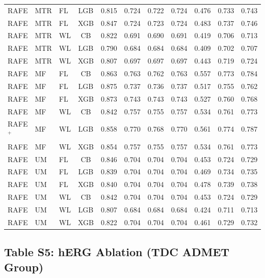 \documentclass[9pt,a4paper]{article}
\begin{document}
\begin{scriptsize}
\begin{longtable}{lllcrrrrrrr}
RAFE & MTR & FL & LGB & 0.815 & 0.724 & 0.722 & 0.724 & 0.476 & 0.733 & 0.743 \\
RAFE & MTR & FL & XGB & 0.847 & 0.724 & 0.723 & 0.724 & 0.483 & 0.737 & 0.746 \\
RAFE & MTR & WL & CB  & 0.822 & 0.691 & 0.690 & 0.691 & 0.419 & 0.706 & 0.713 \\
RAFE & MTR & WL & LGB & 0.790 & 0.684 & 0.684 & 0.684 & 0.409 & 0.702 & 0.707 \\
RAFE & MTR & WL & XGB & 0.807 & 0.697 & 0.697 & 0.697 & 0.443 & 0.719 & 0.724 \\
RAFE & MF  & FL & CB  & 0.863 & 0.763 & 0.762 & 0.763 & 0.557 & 0.773 & 0.784 \\
RAFE & MF  & FL & LGB & 0.875 & 0.737 & 0.736 & 0.737 & 0.517 & 0.755 & 0.762 \\
RAFE & MF  & FL & XGB & 0.873 & 0.743 & 0.743 & 0.743 & 0.527 & 0.760 & 0.768 \\
RAFE & MF  & WL & CB  & 0.842 & 0.757 & 0.755 & 0.757 & 0.534 & 0.761 & 0.773 \\
RAFE$^+$ & MF & WL & LGB & 0.858 & 0.770 & 0.768 & 0.770 & 0.561 & 0.774 & 0.787 \\
RAFE & MF  & WL & XGB & 0.854 & 0.757 & 0.755 & 0.757 & 0.534 & 0.761 & 0.773 \\
RAFE & UM  & FL & CB  & 0.846 & 0.704 & 0.704 & 0.704 & 0.453 & 0.724 & 0.729 \\
RAFE & UM  & FL & LGB & 0.839 & 0.704 & 0.704 & 0.704 & 0.469 & 0.734 & 0.735 \\
RAFE & UM  & FL & XGB & 0.840 & 0.704 & 0.704 & 0.704 & 0.478 & 0.739 & 0.738 \\
RAFE & UM  & WL & CB  & 0.842 & 0.704 & 0.704 & 0.704 & 0.453 & 0.724 & 0.729 \\
RAFE & UM  & WL & LGB & 0.807 & 0.684 & 0.684 & 0.684 & 0.424 & 0.711 & 0.713 \\
RAFE & UM  & WL & XGB & 0.822 & 0.704 & 0.704 & 0.704 & 0.461 & 0.729 & 0.732 \\
\end{longtable}
\end{scriptsize}

\newpage

\subsection*{Table S5: hERG Ablation (TDC ADMET Group)}
\end{document}
